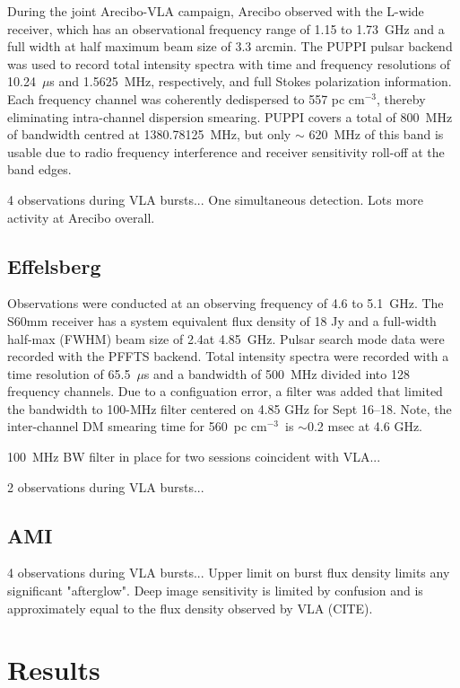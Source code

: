 \documentclass{emulateapj}
\begin{document}
During the joint Arecibo-VLA campaign, Arecibo observed with the L-wide receiver, which has an observational frequency range of 1.15 to 1.73~GHz and a full width at half maximum beam size of 3.3 arcmin. The PUPPI pulsar backend was used to record total intensity spectra with time and frequency resolutions of 10.24~$\mu$s and 1.5625~MHz, respectively, and full Stokes polarization information. Each frequency channel was coherently dedispersed to 557 pc cm$^{-3}$, thereby eliminating intra-channel dispersion smearing. PUPPI covers a total of 800~MHz of bandwidth centred at 1380.78125~MHz, but only $\sim$ 620~MHz of this band is usable due to radio frequency interference and receiver sensitivity roll-off at the band edges.

4 observations during VLA bursts... One simultaneous detection. Lots more activity at Arecibo overall.

\subsection{Effelsberg}

Observations were conducted at an observing frequency of 4.6 to 5.1~GHz. The S60mm receiver has a system equivalent flux density of 18 Jy and a full-width half-max (FWHM) beam size of 2.4\arcmin at 4.85~GHz. Pulsar search mode data were recorded with the PFFTS backend. Total intensity spectra were recorded with a time resolution of 65.5~$\mu$s and a bandwidth of 500~MHz divided into 128 frequency channels. Due to a configuation error, a filter was added that limited the bandwidth to 100-MHz filter centered on 4.85 GHz for Sept 16--18. Note, the inter-channel DM smearing time for 560~pc cm$^{-3}$\ is $\sim$0.2 msec at 4.6 GHz.

100~MHz BW filter in place for two sessions coincident with VLA...

2 observations during VLA bursts...

\subsection{AMI}

4 observations during VLA bursts... Upper limit on burst flux density limits any significant "afterglow". Deep image sensitivity is limited by confusion and is approximately equal to the flux density observed by VLA (CITE).

\section{Results}
\end{document}

